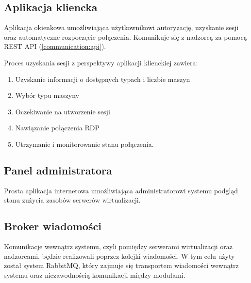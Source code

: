 \documentclass[../opis-rozwiazania.tex]{subfiles}
\begin{document}
\subsection{Aplikacja kliencka}
\label{modules:client}

Aplikacja okienkowa umożliwiająca użytkownikowi autoryzację, uzyskanie sesji oraz automatyczne rozpoczęcie połączenia. Komunikuje się z nadzorcą za pomocą REST API (\ref{communication:api}).

Proces uzyskania sesji z perspektywy aplikacji klienckiej zawiera:
\begin{enumerate}
    \item Uzyskanie informacji o dostępnych typach i liczbie maszyn
    \item Wybór typu maszyny
    \item Oczekiwanie na utworzenie sesji
    \item Nawiązanie połączenia RDP
    \item Utrzymanie i monitorowanie stanu połączenia.
\end{enumerate}

\subsection{Panel administratora}

Prosta aplikacja internetowa umożliwiająca administratorowi systemu podgląd stanu zużycia zasobów serwerów wirtualizacji.

\subsection{Broker wiadomości}
\label{modules:broker}

Komunikacje wewnątrz systemu, czyli pomiędzy serwerami wirtualizacji oraz nadzorcami, będzie realizowali poprzez kolejki wiadomości. W tym celu użyty został system RabbitMQ, który zajmuje się transportem wiadomości wewnątrz systemu oraz niezawodnością komunikacji między modułami.
\end{document}

